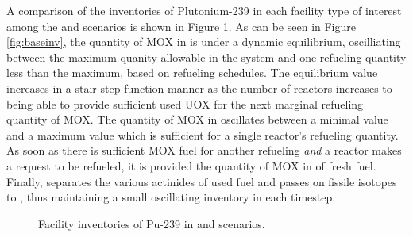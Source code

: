 A comparison of the inventories of Plutonium-239 in each facility type of
interest among the \basecase and \outage scenarios is shown in Figure
\ref{fig:outage}. As can be seen in Figure \ref{fig:baseinv}, the quantity of
MOX in \reactors is under a dynamic equilibrium, oscilliating between the
maximum quanity allowable in the system and one refueling quantity less than the
maximum, based on refueling schedules. The equilibrium value increases in a
stair-step-function manner as the number of reactors increases to being able to
provide sufficient used UOX for the next marginal refueling quantity of MOX. The
quantity of MOX in \fabrication oscillates between a minimal value and a maximum
value which is sufficient for a single reactor's refueling quantity. As soon as
there is sufficient MOX fuel for another refueling \textit{and} a reactor makes
a request to be refueled, it is provided the quantity of MOX in of fresh
fuel. Finally, \separations separates the various actinides of used fuel and
passes on fissile isotopes to \fabrication, thus maintaining a small oscillating
inventory in each timestep.

\begin{figure}
  \centering
  \begin{minipage}{0.67\textwidth}
    \centering 
    \vfill 
  \end{minipage}%
  \begin{minipage}{0.33\textwidth}
    \centering
  \end{minipage}%
  \caption[]{
    \label{fig:outage}
    Facility inventories of Pu-239 in \basecase and \outage scenarios.}
\end{figure}

